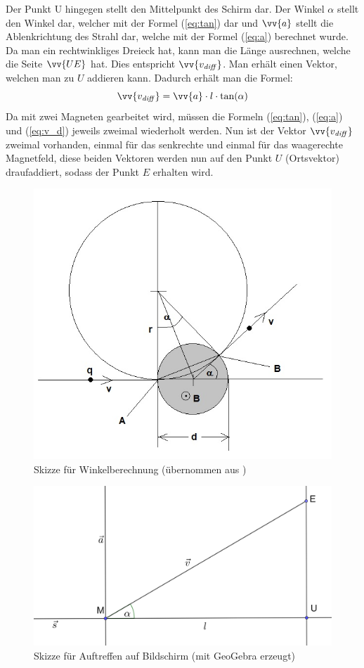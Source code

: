 Der Punkt U hingegen stellt den Mittelpunkt des Schirm dar.
Der Winkel $\alpha$ stellt den Winkel dar, welcher mit der Formel (\ref{eq:tan}) dar und $\vv{a}$ stellt die Ablenkrichtung des Strahl dar, welche mit der Formel (\ref{eq:a}) berechnet wurde.
Da man ein rechtwinkliges Dreieck hat, kann man die Länge ausrechnen, welche die Seite $\vv{UE}$ hat.
Dies entspricht $\vv{v_\mathit{diff}}$.
Man erhält einen Vektor, welchen man zu $U$ addieren kann.
Dadurch erhält man die Formel:
\begin{equation}
    \label{eq:v_d}
    \vv{v_\mathit{diff}} =  \vv{a} \cdot l \cdot \tan(\alpha)
\end{equation}
Da mit zwei Magneten gearbeitet wird, müssen die Formeln (\ref{eq:tan}), (\ref{eq:a}) und (\ref{eq:v_d}) jeweils zweimal wiederholt werden.
Nun ist der Vektor $\vv{v_\mathit{diff}}$ zweimal vorhanden, einmal für das senkrechte und einmal für das waagerechte Magnetfeld, diese beiden Vektoren werden nun auf den Punkt $U$ (Ortsvektor) draufaddiert, sodass der Punkt $E$ erhalten wird.
\begin{figure}
    \centering
    \includegraphics[width=.75\textwidth]{fig/elektronenstrahl-ablenkung_101.jpg}
    \caption{Skizze für Winkelberechnung (übernommen aus \cite{Blog})}
    \label{fig:ausBlog}
\end{figure}

\begin{figure}
    \centering
    \includegraphics[width=.75\textwidth]{fig/Bildschirm_Skizze.png}
    \caption{Skizze für Auftreffen auf Bildschirm (mit GeoGebra erzeugt)}
    \label{fig:Schirm}
\end{figure}

